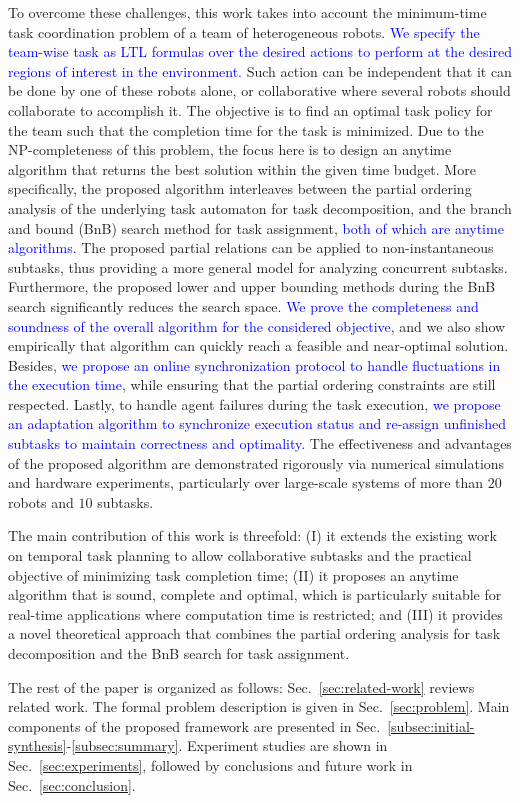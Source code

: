 To overcome these challenges,
this work takes into account the minimum-time task coordination problem of a team of heterogeneous robots.
\textcolor{blue}{We specify the team-wise task as LTL formulas over the desired actions to perform at the
desired regions of interest in the environment.}
Such action can be independent that it can be done by one of these robots alone,
or collaborative where several robots should collaborate to accomplish it.
The objective is to find an optimal task policy for the team such that the completion time for the task is minimized.
Due to the NP-completeness of this problem,
the focus here is to design an anytime algorithm that returns the best solution within the given time budget.
More specifically,
the proposed algorithm interleaves between the partial ordering analysis
of the underlying task automaton for task decomposition,
and the branch and bound (BnB) search method for task assignment,
\textcolor{blue}{both of which are anytime algorithms.}
The proposed partial relations can be applied to non-instantaneous subtasks,
thus providing a more general model for analyzing concurrent subtasks.
Furthermore, the proposed lower and upper bounding methods during the BnB search
significantly reduces the search space.
\textcolor{blue}{We prove the completeness and soundness of the overall algorithm for the considered objective},
and we also show empirically that algorithm can quickly reach a feasible and near-optimal solution.
Besides,
\textcolor{blue}{we propose an online synchronization protocol to handle fluctuations in the execution time},
while ensuring that the partial ordering constraints are still respected.
Lastly, to handle agent failures during the task execution,
\textcolor{blue}{we propose an adaptation algorithm to synchronize execution
status and re-assign unfinished subtasks
to maintain correctness and optimality.}
The effectiveness and advantages of the proposed algorithm
are demonstrated rigorously via numerical simulations and hardware experiments,
particularly over {large-scale} systems of more than $20$ robots and $10$ subtasks.


The main contribution of this work is threefold:
(I) it extends the existing work on temporal task planning to allow collaborative subtasks
and the practical objective of minimizing task completion time;
(II) it proposes an anytime algorithm that is sound, complete and optimal,
which is particularly suitable for real-time applications where computation time is restricted;
and (III) it provides a novel theoretical approach that combines the partial ordering
analysis for task decomposition and the BnB search for task assignment.

The rest of the paper is organized as follows:
Sec.~\ref{sec:related-work} reviews related work.
The formal problem description is given in Sec.~\ref{sec:problem}.
Main components of the proposed framework are presented in
Sec.~\ref{subsec:initial-synthesis}-\ref{subsec:summary}.
Experiment studies are shown in Sec.~\ref{sec:experiments},
followed by conclusions and future work in Sec.~\ref{sec:conclusion}.
